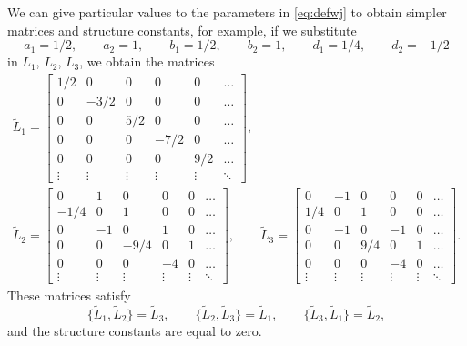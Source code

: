 \documentclass[10pt,a4paper]{amsart}
\numberwithin{equation}{section}
\begin{document}
	We can give particular values to the parameters in \eqref{eq:defwj} to obtain simpler matrices and structure constants, for example, if we substitute
	\[ a_1=1/2,\qquad a_2=1,\qquad b_1=1/2,\qquad b_2=1,\qquad d_1=1/4,\qquad d_2=-1/2 \]
in $L_1$, $L_2$, $L_3$, we obtain the matrices
	\begin{gather*}%
		\tilde{L}_1= \begin{bmatrix} 1/2 & 0 & 0 & 0 & 0 & \dots \\
			0  & -3/2 & 0 & 0 & 0 & \dots \\
			0 & 0  & 5/2  & 0 & 0  & \dots \\
			0 & 0 & 0  & -7/2 & 0 & \dots \\
      0 & 0 & 0  & 0  & 9/2 & \dots \\
		\vdots  & \vdots  & \vdots  & \vdots & \vdots  &  \ddots  \end{bmatrix},
\\%
	\tilde{L}_2 = \begin{bmatrix} 0 & 1 & 0 & 0 & 0 & \dots \\
			-1/4 & 0 & 1 & 0 & 0 & \dots \\
			0 & -1 & 0  & 1 &0 & \dots \\
			0 & 0 & -9/4 & 0 & 1 & \dots \\
      0 & 0 & 0  & -4  & 0  & \dots \\
		\vdots  & \vdots  & \vdots  & \vdots  & \vdots  & \ddots  \end{bmatrix},
\qquad
		\tilde{L}_3 = \begin{bmatrix} 0 & -1 & 0 & 0 & 0 & \dots \\
			1/4 & 0 & 1 & 0 & 0 & \dots \\
			0 & -1 & 0  & -1 &0 & \dots \\
			0 & 0 & 9/4 & 0 & 1 & \dots \\
      0 & 0 & 0  & -4  & 0  & \dots \\
		\vdots  & \vdots  & \vdots  & \vdots  & \vdots  & \ddots  \end{bmatrix}.
\end{gather*}
These matrices satisfy{\samepage
\[ \bigl\{\tilde{L}_1, \tilde{L}_2\bigr\}= \tilde{L}_3,\qquad \bigl\{\tilde{L}_2, \tilde{L}_3\bigr\}= \tilde{L}_1, \qquad \bigl\{\tilde{L}_3, \tilde{L}_1\bigr\}= \tilde{L}_2, \]
and the structure constants are equal to zero.}
\end{document}
